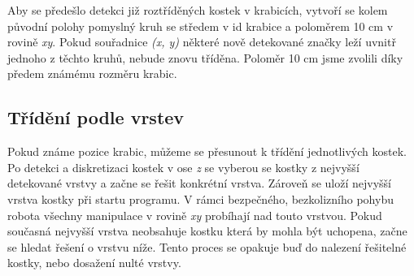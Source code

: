 \documentclass[journal,twoside,web]{ieeecolor}
\begin{document}
Aby se předešlo detekci již roztříděných kostek v %
krabicích, vytvoří se kolem původní polohy pomyslný kruh se středem v id krabice a poloměrem 10 cm v rovině \textit{xy}. Pokud souřadnice \textit{(x, y)}
některé nově detekované značky leží uvnitř jednoho z těchto kruhů, nebude znovu tříděna. Poloměr 10 cm jsme zvolili díky předem známému rozměru krabic.


\subsection{Třídění podle vrstev}
Pokud známe pozice krabic, můžeme se přesunout k třídění jednotlivých kostek. Po detekci a diskretizaci kostek v ose \textit{z} se vyberou se kostky
z nejvyšší detekované vrstvy a začne se řešit konkrétní vrstva. Zároveň se uloží nejvyšší vrstva kostky při startu programu. V rámci bezpečného, bezkolizního
pohybu robota všechny manipulace v rovině \textit{xy} probíhají nad touto vrstvou. Pokud současná nejvyšší vrstva neobsahuje kostku která by mohla být uchopena, %
začne se hledat řešení o vrstvu níže. Tento proces se opakuje buď do nalezení řešitelné kostky, nebo dosažení nulté vrstvy.
\end{document}
